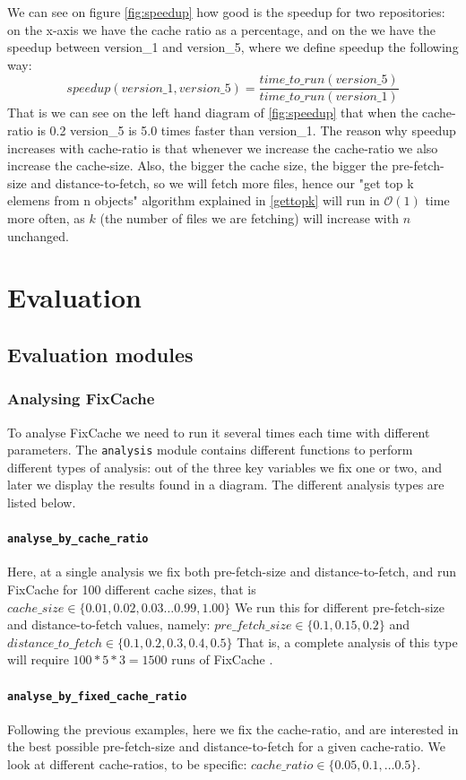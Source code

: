 \documentclass[12pt,twoside,notitlepage]{report}
\newcommand{\fxch}{FixCache }
\begin{document}
We can see on figure \ref{fig:speedup} how good is the speedup for two repositories: on the x-axis we have the cache ratio as a percentage, and on the we have the speedup between version\_1 and version\_5, where we define speedup the following way:
\[speedup(version\_1,version\_5) = \frac{time\_to\_run(version\_5)}{time\_to\_run(version\_1)}
\]
That is we can see on the left hand diagram of \ref{fig:speedup} that when the cache-ratio is 0.2 version\_5 is 5.0 times faster than version\_1. The reason why speedup increases with cache-ratio is that whenever we increase the cache-ratio we also increase the cache-size. Also, the bigger the cache size, the bigger the pre-fetch-size and distance-to-fetch, so we will fetch more files, hence our "get top k elemens from n objects" algorithm explained in \ref{gettopk} will run in $\mathcal{O}(1)$ time more often, as $k$ (the number of files we are fetching) will increase with $n$ unchanged.
\chapter{Evaluation}
\section{Evaluation modules}
\subsection{Analysing \fxch}
To analyse \fxch we need to run it several times each time with different parameters. The \texttt{analysis} module contains different functions to perform different types of analysis: out of the three key variables we fix one or two, and later we display the results found in a diagram. The different analysis types are listed below.
\subsubsection{\texttt{analyse\_by\_cache\_ratio}} Here, at a single analysis we fix both pre-fetch-size and distance-to-fetch, and run \fxch for 100 different cache sizes, that is $cache\_size \in \{0.01, 0.02, 0.03 \dots 0.99, 1.00\}$ We run this for different pre-fetch-size and distance-to-fetch values, namely: $pre\_fetch\_size \in \{0.1, 0.15, 0.2\}$ and $distance\_to\_fetch \in \{0.1, 0.2, 0.3, 0.4, 0.5\}$ That is, a complete analysis of this type will require $100*5*3=1500$ runs of \fxch.
\subsubsection{\texttt{analyse\_by\_fixed\_cache\_ratio}} 
Following the previous examples, here we fix the cache-ratio, and are interested in the best possible pre-fetch-size and distance-to-fetch for a given cache-ratio. We look at different cache-ratios, to be specific: $cache\_ratio \in \{0.05, 0.1, \dots 0.5\}$. 
\end{document}
